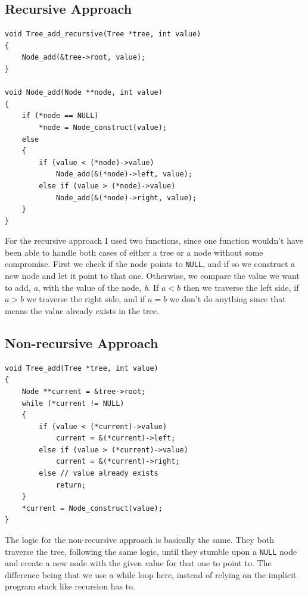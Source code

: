 \documentclass[a4paper, 11pt]{article}
\begin{document}
\subsection{Recursive Approach}
	\begin{verbatim}
void Tree_add_recursive(Tree *tree, int value)
{
	Node_add(&tree->root, value);
}

void Node_add(Node **node, int value)
{
	if (*node == NULL)
		*node = Node_construct(value);
	else
	{
		if (value < (*node)->value)
			Node_add(&(*node)->left, value);
		else if (value > (*node)->value)
			Node_add(&(*node)->right, value);
	}
}
	\end{verbatim}
	For the recursive approach I used two functions,
	since one function wouldn't have been able to handle both cases of either a tree or a node without some compromise.
	First we check if the node points to \texttt{NULL}, and if so we construct a new node and let it point to that one.
	Otherwise, we compare the value we want to add, \textit{a}, with the value of the node, \textit{b}.
	If \(a < b\) then we traverse the left side,
	if \(a > b\) we traverse the right side,
	and if \(a = b\) we don't do anything since that means the value already exists in the tree.
\subsection{Non-recursive Approach}
	\begin{verbatim}
void Tree_add(Tree *tree, int value)
{
	Node **current = &tree->root;
	while (*current != NULL)
	{
		if (value < (*current)->value)
			current = &(*current)->left;
		else if (value > (*current)->value)
			current = &(*current)->right;
		else // value already exists
			return;
	}
	*current = Node_construct(value);
}
	\end{verbatim}
	The logic for the non-recursive approach is basically the same.
	They both traverse the tree, following the same logic,
	until they stumble upon a \texttt{NULL} node and create a new node with the given value for that one to point to.
	The difference being that we use a while loop here, instead of relying on the implicit program stack like recursion has to.
\end{document}
